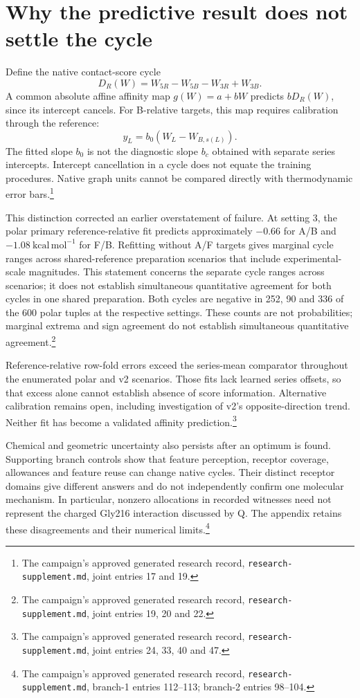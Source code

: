 \documentclass{article}
\newcommand{\rr}[1]{\footnote{The campaign's approved generated research record, \texttt{research-supplement.md}, #1.}}
\begin{document}
\section{Why the predictive result does not settle the cycle}

Define the native contact-score cycle
\[
 D_R(W)=W_{5R}-W_{5B}-W_{3R}+W_{3B}.
\]
A common absolute affine affinity map \(g(W)=a+bW\) predicts \(bD_R(W)\), since its intercept cancels. For B-relative targets, this map requires calibration through the reference:
\[
 y_L=b_0(W_L-W_{B,s(L)}).
\]
The fitted slope \(b_0\) is not the diagnostic slope \(b_c\) obtained with separate series intercepts. Intercept cancellation in a cycle does not equate the training procedures. Native graph units cannot be compared directly with thermodynamic error bars.\rr{joint entries 17 and 19}

This distinction corrected an earlier overstatement of failure. At setting 3, the polar primary reference-relative fit predicts approximately \(-0.66\) for A/B and \(-1.08\ \mathrm{kcal\,mol^{-1}}\) for F/B. Refitting without A/F targets gives marginal cycle ranges across shared-reference preparation scenarios that include experimental-scale magnitudes. This statement concerns the separate cycle ranges across scenarios; it does not establish simultaneous quantitative agreement for both cycles in one shared preparation. Both cycles are negative in 252, 90 and 336 of the 600 polar tuples at the respective settings. These counts are not probabilities; marginal extrema and sign agreement do not establish simultaneous quantitative agreement.\rr{joint entries 19, 20 and 22}

Reference-relative row-fold errors exceed the series-mean comparator throughout the enumerated polar and v2 scenarios. Those fits lack learned series offsets, so that excess alone cannot establish absence of score information. Alternative calibration remains open, including investigation of v2's opposite-direction trend. Neither fit has become a validated affinity prediction.\rr{joint entries 24, 33, 40 and 47}

Chemical and geometric uncertainty also persists after an optimum is found. Supporting branch controls show that feature perception, receptor coverage, allowances and feature reuse can change native cycles. Their distinct receptor domains give different answers and do not independently confirm one molecular mechanism. In particular, nonzero allocations in recorded witnesses need not represent the charged Gly216 interaction discussed by Q. The appendix retains these disagreements and their numerical limits.\rr{branch-1 entries 112--113; branch-2 entries 98--104}
\end{document}
